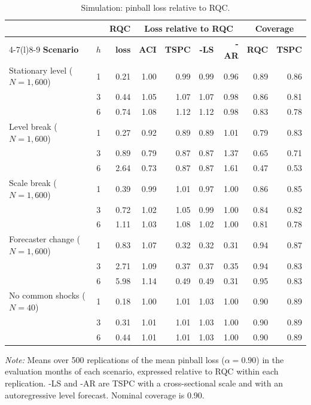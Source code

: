 \begin{table}[t]
\caption{Simulation: pinball loss relative to RQC.\label{tab:sim}}
\centering\footnotesize\setlength{\tabcolsep}{2.4pt}
\begin{tabular*}{\columnwidth}{@{\extracolsep\fill}lc r rrrr rr@{}}
\toprule
 & & \textbf{RQC} & \multicolumn{4}{c}{\textbf{Loss relative to RQC}} & \multicolumn{2}{c}{\textbf{Coverage}} \\
\cmidrule(lr){4-7}\cmidrule(l){8-9}
\textbf{Scenario} & $h$ & \textbf{loss} & \textbf{ACI} & \textbf{TSPC} & \textbf{-LS} & \textbf{-AR} & \textbf{RQC} & \textbf{TSPC} \\
\midrule
Stationary level ($N=1{,}600$) & 1 & 0.21 & 1.00 & 0.99 & 0.99 & 0.96 & 0.89 & 0.86 \\
 & 3 & 0.44 & 1.05 & 1.07 & 1.07 & 0.98 & 0.86 & 0.81 \\
 & 6 & 0.74 & 1.08 & 1.12 & 1.12 & 0.98 & 0.83 & 0.78 \\
\addlinespace
Level break ($N=1{,}600$) & 1 & 0.27 & 0.92 & 0.89 & 0.89 & 1.01 & 0.79 & 0.83 \\
 & 3 & 0.89 & 0.79 & 0.87 & 0.87 & 1.37 & 0.65 & 0.71 \\
 & 6 & 2.64 & 0.73 & 0.87 & 0.87 & 1.61 & 0.47 & 0.53 \\
\addlinespace
Scale break ($N=1{,}600$) & 1 & 0.39 & 0.99 & 1.01 & 0.97 & 1.00 & 0.86 & 0.85 \\
 & 3 & 0.72 & 1.02 & 1.05 & 0.99 & 1.00 & 0.84 & 0.82 \\
 & 6 & 1.11 & 1.03 & 1.08 & 1.02 & 1.00 & 0.81 & 0.78 \\
\addlinespace
Forecaster change ($N=1{,}600$) & 1 & 0.83 & 1.07 & 0.32 & 0.32 & 0.31 & 0.94 & 0.87 \\
 & 3 & 2.71 & 1.09 & 0.37 & 0.37 & 0.35 & 0.94 & 0.83 \\
 & 6 & 5.98 & 1.14 & 0.49 & 0.49 & 0.31 & 0.95 & 0.83 \\
\addlinespace
No common shocks ($N=40$) & 1 & 0.18 & 1.00 & 1.01 & 1.03 & 1.00 & 0.90 & 0.89 \\
 & 3 & 0.31 & 1.01 & 1.01 & 1.03 & 1.00 & 0.90 & 0.89 \\
 & 6 & 0.44 & 1.01 & 1.01 & 1.03 & 1.00 & 0.90 & 0.89 \\
\bottomrule
\end{tabular*}
\begin{tablenotes}
\item \textit{Note:} Means over 500 replications of the mean pinball loss ($\alpha=0.90$) in the evaluation months of each scenario, expressed relative to RQC within each replication. -LS and -AR are TSPC with a cross-sectional scale and with an autoregressive level forecast. Nominal coverage is 0.90.
\end{tablenotes}
\end{table}
